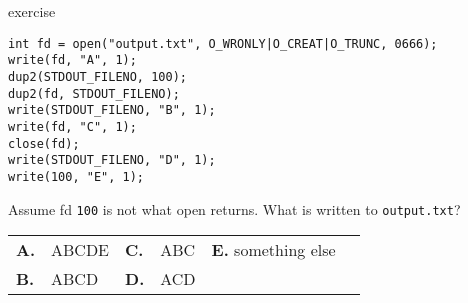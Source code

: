 \begin{frame}[fragile,label=ex]{exercise}
\begin{lstlisting}[style=small]
int fd = open("output.txt", O_WRONLY|O_CREAT|O_TRUNC, 0666);
write(fd, "A", 1);
dup2(STDOUT_FILENO, 100);
dup2(fd, STDOUT_FILENO);
write(STDOUT_FILENO, "B", 1);
write(fd, "C", 1);
close(fd);
write(STDOUT_FILENO, "D", 1);
write(100, "E", 1);
\end{lstlisting}
Assume fd \texttt{100} is not what open returns.
What is written to \texttt{output.txt}? \\
\begin{tabular}{llllll}
\textbf{A.} & ABCDE & \textbf{C.} & ABC & \textbf{E.} something else \\
\textbf{B.} & ABCD & \textbf{D.} & ACD \\
\end{tabular}
\end{frame}

